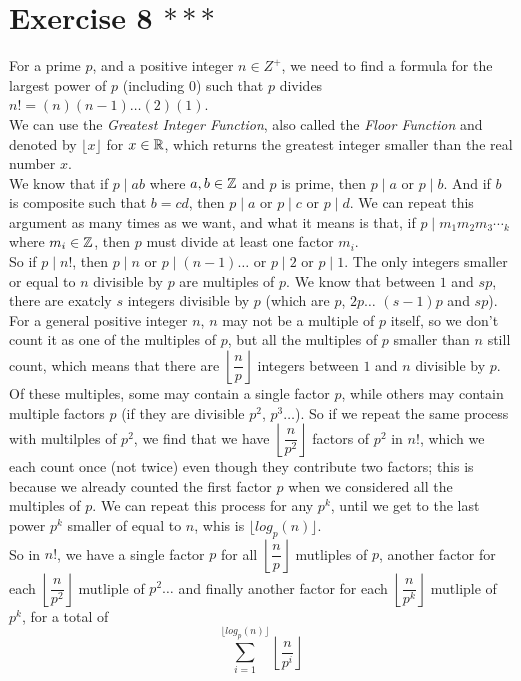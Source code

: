 \documentclass[12pt]{article}
\begin{document}
    \section*{Exercise 8 $***$}
    For a prime $p$,
    and a positive integer $n \in Z^+$,
    we need to find a formula for the largest power of $p$
    (including $0$)
    such that $p$ divides $n! = (n)(n-1)\dots(2)(1)$. \\
    We can use the \textit{Greatest Integer Function},
    also called the \textit{Floor Function}
    and denoted by $\lfloor x \rfloor$ for $x \in \mathbb{R}$,
    which returns the greatest integer
    smaller than the real number $x$. \\
    We know that if $p \mid ab$ where $a, b \in \mathbb{Z}$ and $p$ is prime,
    then $p \mid a$ or $p \mid b$.
    And if $b$ is composite such that $b = cd$,
    then $p \mid a$ or $p \mid c$ or $p \mid d$.
    We can repeat this argument as many times as we want,
    and what it means is that,
    if $p \mid m_1m_2m_3\dotsm_k$ where $m_i \in \mathbb{Z}$,
    then $p$ must divide at least one factor $m_i$. \\
    So if $p \mid n!$,
    then $p \mid n$ or $p \mid (n-1) \dots$
    or $p \mid 2$ or $p \mid 1$.
    The only integers smaller or equal to $n$ divisible by $p$
    are multiples of $p$.
    We know that between $1$ and $sp$,
    there are exatcly $s$ integers divisible by $p$
    (which are $p$, $2p\dots$ $(s-1)p$ and $sp$).
    For a general positive integer $n$,
    $n$ may not be a multiple of $p$ itself,
    so we don't count it as one of the multiples of $p$,
    but all the multiples of $p$ smaller than $n$ still count,
    which means that there are
    $\left\lfloor \dfrac{n}{p} \right\rfloor$
    integers between $1$ and $n$ divisible by $p$. \\
    Of these multiples, some may contain a single factor $p$,
    while others may contain multiple factors $p$
    (if they are divisible $p^2$, $p^3 \dots$).
    So if we repeat the same process with multilples of $p^2$,
    we find that we have $\left\lfloor \dfrac{n}{p^2} \right\rfloor$
    factors of $p^2$ in $n!$,
    which we each count once (not twice)
    even though they contribute two factors;
    this is because we already counted the first factor $p$
    when we considered all the multiples of $p$.
    We can repeat this process for any $p^k$,
    until we get to the last power $p^k$ smaller of equal to $n$,
    whis is $\lfloor log_p(n) \rfloor$. \\
    So in $n!$, we have a single factor $p$
    for all $\left\lfloor \dfrac{n}{p} \right\rfloor$ mutliples of $p$,
    another factor for each $\left\lfloor \dfrac{n}{p^2} \right\rfloor$
    mutliple of $p^2 \dots$
    and finally another factor for each 
    $\left\lfloor \dfrac{n}{p^k} \right\rfloor$ mutliple of $p^k$,
    for a total of
    \[ \sum_{i = 1}^{\lfloor log_p(n) \rfloor}
    \left\lfloor \dfrac{n}{p^i} \right\rfloor \]
\end{document}
